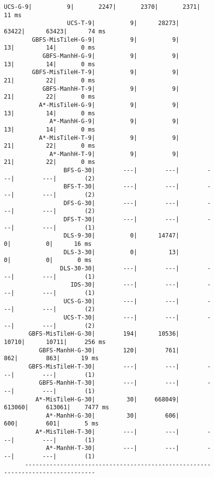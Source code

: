 \documentclass{article}
\begin{document}
\begin{figure}[H]
\begin{Verbatim}[fontsize=\footnotesize]
                  UCS-G-9|          9|       2247|       2370|       2371|      11 ms
                  UCS-T-9|          9|      28273|      63422|      63423|      74 ms
        GBFS-MisTileH-G-9|          9|          9|         13|         14|       0 ms
           GBFS-ManhH-G-9|          9|          9|         13|         14|       0 ms
        GBFS-MisTileH-T-9|          9|          9|         21|         22|       0 ms
           GBFS-ManhH-T-9|          9|          9|         21|         22|       0 ms
          A*-MisTileH-G-9|          9|          9|         13|         14|       0 ms
             A*-ManhH-G-9|          9|          9|         13|         14|       0 ms
          A*-MisTileH-T-9|          9|          9|         21|         22|       0 ms
             A*-ManhH-T-9|          9|          9|         21|         22|       0 ms
                 BFS-G-30|        ---|        ---|        ---|        ---|        (2)
                 BFS-T-30|        ---|        ---|        ---|        ---|        (2)
                 DFS-G-30|        ---|        ---|        ---|        ---|        (2)
                 DFS-T-30|        ---|        ---|        ---|        ---|        (1)
                 DLS-9-30|          0|      14747|          0|          0|      16 ms
                 DLS-3-30|          0|         13|          0|          0|       0 ms
                DLS-30-30|        ---|        ---|        ---|        ---|        (1)
                   IDS-30|        ---|        ---|        ---|        ---|        (1)
                 UCS-G-30|        ---|        ---|        ---|        ---|        (2)
                 UCS-T-30|        ---|        ---|        ---|        ---|        (2)
       GBFS-MisTileH-G-30|        194|      10536|      10710|      10711|     256 ms
          GBFS-ManhH-G-30|        120|        761|        862|        863|      19 ms
       GBFS-MisTileH-T-30|        ---|        ---|        ---|        ---|        (1)
          GBFS-ManhH-T-30|        ---|        ---|        ---|        ---|        (1)
         A*-MisTileH-G-30|         30|     668049|     613060|     613061|    7477 ms
            A*-ManhH-G-30|         30|        606|        600|        601|       5 ms
         A*-MisTileH-T-30|        ---|        ---|        ---|        ---|        (1)
            A*-ManhH-T-30|        ---|        ---|        ---|        ---|        (1)
      -------------------------------------------------------------------------------      
      \end{Verbatim}
\end{figure}
\end{document}
